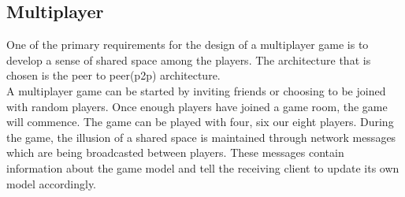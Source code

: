 \subsection*{Multiplayer}
One of the primary requirements for the design of a multiplayer game is to develop a sense of shared space among the players. The architecture that is chosen is the peer to peer(p2p) architecture. \\
A multiplayer game can be started by inviting friends or choosing to be joined with random players. Once enough players have joined a game room, the game will commence. The game can be played with four, six our eight players. During the game, the illusion of a shared space is maintained through network messages which are being broadcasted between players. These messages contain information about the game model and tell the receiving client to update its own model accordingly.